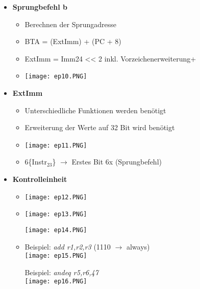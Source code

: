 \begin{itemize}
        \item \textbf{Sprungbefehl b}
            \begin{itemize}
                \item Berechnen der Sprungadresse
                \item BTA = (ExtImm) + (PC + 8)
                \item ExtImm = Imm24 << 2 inkl. Vorzeichenerweiterung+
                \item[] \texttt{[image: ep10.PNG]}
            \end{itemize}

        \item \textbf{ExtImm}
            \begin{itemize}
                \item Unterschiedliche Funktionen werden benötigt
                \item Erweiterung der Werte auf 32 Bit wird benötigt
                \item[] \texttt{[image: ep11.PNG]}
                \item[] 6\{Instr$_{23}$\} $\rightarrow$ Erstes Bit 6x (Sprungbefehl)  
            \end{itemize}

        \item \textbf{Kontrolleinheit}
            \begin{itemize}
                \item[] \texttt{[image: ep12.PNG]}
                \item[]
                    \begin{minipage}{0.4\textwidth}
                        \texttt{[image: ep13.PNG]}
                    \end{minipage}
                    \begin{minipage}{0.45\textwidth}
                        \texttt{[image: ep14.PNG]}
                    \end{minipage}
                \item[]
                    \begin{minipage}{0.4\textwidth}
                        Beispiel: \textit{add r1,r2,r3} (1110 $\rightarrow$ always) \\
                        \texttt{[image: ep15.PNG]}
                    \end{minipage}
                    \begin{minipage}{0.45\textwidth}
                        Beispiel: \textit{andeq r5,r6,47} \\
                        \texttt{[image: ep16.PNG]}
                    \end{minipage}
            \end{itemize}


\end{itemize}
